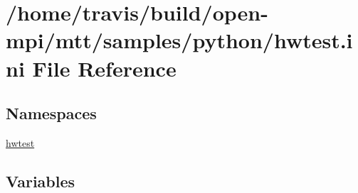 \hypertarget{hwtest_8ini}{\section{/home/travis/build/open-\/mpi/mtt/samples/python/hwtest.ini File Reference}
\label{hwtest_8ini}
}
\subsection*{Namespaces}
\begin{DoxyCompactItemize}
\item 
\hyperlink{namespacehwtest}{hwtest}
\end{DoxyCompactItemize}
\subsection*{Variables}

